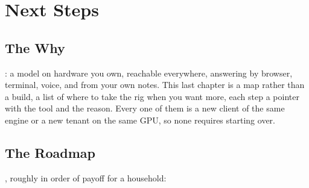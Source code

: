 
\chapter{Next Steps}
\vspace{1.5em}


\section{The Why}

: a model on hardware you own, reachable
everywhere, answering by browser, terminal, voice, and from your own notes. This
last chapter is a map rather than a build, a list of where to take the rig when you
want more, each step a pointer with the tool and the reason. Every one of them is a
new client of the same engine or a new tenant on the same GPU, so none requires
starting over.


\section{The Roadmap}

, roughly in order of payoff for a
household:

